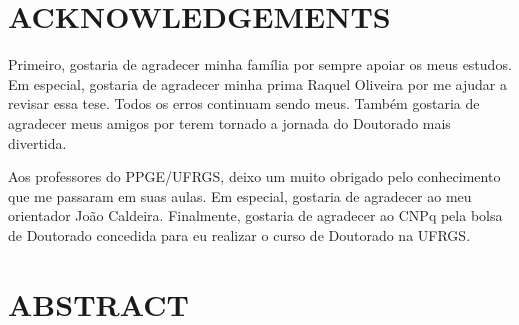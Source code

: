 \documentclass[12pt,oneside,a4paper]{memoir}
\begin{document}
\chapter*{ACKNOWLEDGEMENTS} 

Primeiro, gostaria de agradecer minha família por sempre apoiar os meus estudos.
Em especial, gostaria de agradecer minha prima Raquel Oliveira por me ajudar a revisar essa tese.
Todos os erros continuam sendo meus.
Também gostaria de agradecer meus amigos por terem tornado a jornada do Doutorado mais divertida.

Aos professores do PPGE/UFRGS, deixo um muito obrigado pelo conhecimento que me passaram em suas aulas.
Em especial, gostaria de agradecer ao meu orientador João Caldeira.
Finalmente, gostaria de agradecer ao CNPq pela bolsa de Doutorado concedida para eu realizar o curso de Doutorado na UFRGS.

\clearpage

\chapter*{ABSTRACT} 
\end{document}
